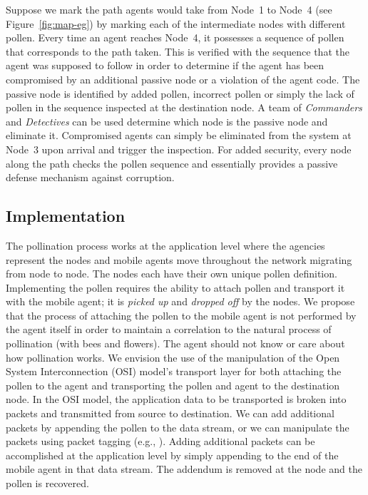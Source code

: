 \documentclass{acm_proc_article-sp}
\begin{document}
Suppose we mark the path agents would take from Node~1 to Node~4 (see Figure~\ref{fig:map-eg}) by marking each of the intermediate nodes with different pollen.  Every time an agent reaches Node~4, it possesses a sequence of pollen that corresponds to the path taken.  This is verified with the sequence that the agent was supposed to follow in order to determine if the agent has been compromised by an additional passive node or a violation of the agent code.  The passive node is identified by added pollen, incorrect pollen or simply the lack of pollen in the sequence inspected at the destination node.  A team of {\it Commanders} and {\it Detectives} can be used determine which node is the passive node and eliminate it.  Compromised agents can simply be eliminated from the system at Node~3 upon arrival and trigger the inspection.  For added security, every node along the path checks the pollen sequence and essentially provides a passive defense mechanism against corruption.

\subsection{Implementation}
The pollination process works at the application level where the agencies represent the nodes and mobile agents move throughout the network migrating from node to node.  The nodes each have their own unique pollen definition.  Implementing the pollen requires the ability to attach pollen and transport it with the mobile agent; it is {\it picked up} and {\it dropped off} by the nodes.  We propose that the process of attaching the pollen to the mobile agent is not performed by the agent itself in order to maintain a correlation to the natural process of pollination (with bees and flowers).  The agent should not know or care about how pollination works.  We envision the use of the manipulation of the Open System Interconnection (OSI) \cite{wetteroth01} model's transport layer for both attaching the pollen to the agent and transporting the pollen and agent to the destination node.  In the OSI model, the application data to be transported is broken into packets and transmitted from source to destination.  We can add additional packets by appending the pollen to the data stream, or we can manipulate the packets using packet tagging (e.g., \cite{belenky03, djemaiel07}).  Adding additional packets can be accomplished at the application level by simply appending to the end of the mobile agent in that data stream.  The addendum is removed at the node and the pollen is recovered.
\end{document}
